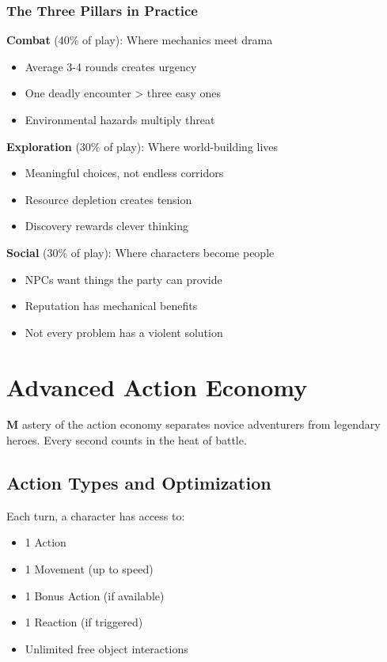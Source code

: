 \documentclass[11pt,letterpaper,openany]{book}
\newcommand{\firstletter}[1]{%
    \textcolor{bloodred}{\fontsize{48}{48}\selectfont\bfseries #1}%
}
\begin{document}
\subsection{The Three Pillars in Practice}

\textbf{Combat} (40\% of play): Where mechanics meet drama
\begin{itemize}
    \item Average 3-4 rounds creates urgency
    \item One deadly encounter > three easy ones
    \item Environmental hazards multiply threat
\end{itemize}

\textbf{Exploration} (30\% of play): Where world-building lives
\begin{itemize}
    \item Meaningful choices, not endless corridors
    \item Resource depletion creates tension
    \item Discovery rewards clever thinking
\end{itemize}

\textbf{Social} (30\% of play): Where characters become people
\begin{itemize}
    \item NPCs want things the party can provide
    \item Reputation has mechanical benefits
    \item Not every problem has a violent solution
\end{itemize}

\chapter{Advanced Action Economy}

\firstletter{M}astery of the action economy separates novice adventurers from legendary heroes. Every second counts in the heat of battle.

\section{Action Types and Optimization}

Each turn, a character has access to:
\begin{itemize}
    \item 1 Action
    \item 1 Movement (up to speed)
    \item 1 Bonus Action (if available)
    \item 1 Reaction (if triggered)
    \item Unlimited free object interactions
\end{itemize}
\end{document}
